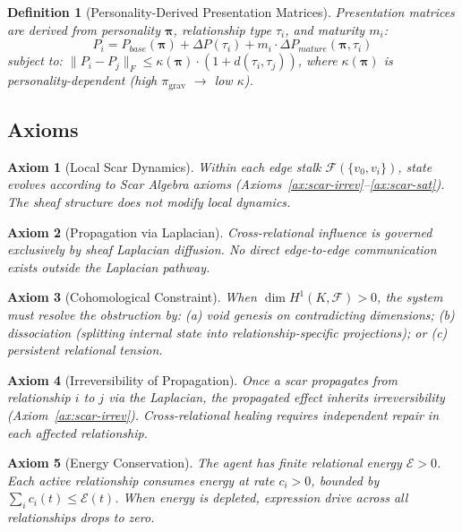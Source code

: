 \documentclass[11pt]{article}
\newtheorem{definition}[theorem]{Definition}
\newtheorem{axiom}{Axiom}[section]
\begin{document}
\begin{definition}[Personality-Derived Presentation Matrices]
Presentation matrices are derived from personality $\boldsymbol{\pi}$, relationship type $\tau_i$, and maturity $m_i$:
\begin{equation}
P_i = P_{base}(\boldsymbol{\pi}) + \Delta P(\tau_i) + m_i \cdot \Delta P_{mature}(\boldsymbol{\pi}, \tau_i)
\end{equation}
subject to: $\|P_i - P_j\|_F \leq \kappa(\boldsymbol{\pi}) \cdot (1 + d(\tau_i, \tau_j))$, where $\kappa(\boldsymbol{\pi})$ is personality-dependent (high $\pi_{\text{grav}}$ $\to$ low $\kappa$).
\end{definition}

\subsection{Axioms}

\begin{axiom}[Local Scar Dynamics]
\label{ax:sheaf-local}
Within each edge stalk $\mathcal{F}(\{v_0, v_i\})$, state evolves according to Scar Algebra axioms (Axioms~\ref{ax:scar-irrev}--\ref{ax:scar-sat}). The sheaf structure does not modify local dynamics.
\end{axiom}

\begin{axiom}[Propagation via Laplacian]
\label{ax:sheaf-propagation}
Cross-relational influence is governed exclusively by sheaf Laplacian diffusion. No direct edge-to-edge communication exists outside the Laplacian pathway.
\end{axiom}

\begin{axiom}[Cohomological Constraint]
\label{ax:sheaf-cohomological}
When $\dim H^1(K, \mathcal{F}) > 0$, the system must resolve the obstruction by: (a) void genesis on contradicting dimensions; (b) dissociation (splitting internal state into relationship-specific projections); or (c) persistent relational tension.
\end{axiom}

\begin{axiom}[Irreversibility of Propagation]
\label{ax:sheaf-irrev}
Once a scar propagates from relationship $i$ to $j$ via the Laplacian, the propagated effect inherits irreversibility (Axiom~\ref{ax:scar-irrev}). Cross-relational healing requires independent repair in each affected relationship.
\end{axiom}

\begin{axiom}[Energy Conservation]
\label{ax:sheaf-energy}
The agent has finite relational energy $\mathcal{E} > 0$. Each active relationship consumes energy at rate $c_i > 0$, bounded by $\sum_i c_i(t) \leq \mathcal{E}(t)$. When energy is depleted, expression drive across all relationships drops to zero.
\end{axiom}
\end{document}
